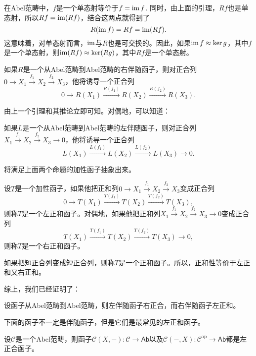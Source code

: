 在Abel范畴中，$f$是一个单态射等价于$f=\operatorname{im} f$. 同时，由上面的引理，$Rf$也是单态射，所以$Rf=\operatorname{im}(Rf)$，结合这两点就得到了
\[
	R(\operatorname{im} f)=Rf=\operatorname{im}(Rf).
\]
这意味着，对单态射而言，$\operatorname{im}$与$R$也是可交换的。因此，如果$\operatorname{im} f\approx \ker g$，其中$f$是一个单态射，则$\operatorname{im}(Rf)\approx \ker(Rg)$，其中$Rf$是一个单态射。

\begin{pro}
如果$R$是一个从Abel范畴到Abel范畴的右伴随函子，则对正合列$0\to X_1\xrightarrow{f_1} X_2\xrightarrow{f_2} X_3$，他将诱导一个正合列
\[
	0\to R(X_1)\xrightarrow{R(f_1)} R(X_2)\xrightarrow{R(f_2)} R(X_3).
\]
\end{pro}

由上一个引理和其推论立即可知。对偶地，可以知道：

\begin{pro}
如果$L$是一个从Abel范畴到Abel范畴的左伴随函子，则对正合列$X_1\xrightarrow{f_1} X_2\xrightarrow{f_2} X_3 \to 0$，他将诱导一个正合列
\[
	L(X_1)\xrightarrow{L(f_1)} L(X_2)\xrightarrow{L(f_2)} L(X_3) \to 0.
\]
\end{pro}

将满足上面两个命题的加性函子抽象出来。

\begin{para}
设$T$是一个加性函子，如果他把正和列$0\to X_1\xrightarrow{f_1} X_2\xrightarrow{f_2} X_3$变成正合列
\[
	0\to T(X_1)\xrightarrow{T(f_1)} T(X_2)\xrightarrow{T(f_2)} T(X_3),
\]
则称$T$是一个左正和函子。对偶地，如果他把正和列$X_1\xrightarrow{f_1} X_2\xrightarrow{f_2} X_3\to 0$变成正合列
\[
	T(X_1)\xrightarrow{T(f_1)} T(X_2)\xrightarrow{T(f_2)} T(X_3)\to 0,
\]
则称$T$是一个右正和函子。

如果把短正合列变成短正合列，则称$T$是一个正和函子。所以，正和性等价于左正和又右正和。
\end{para}

综上，我们已经证明了：

\begin{thm}
设函子从Abel范畴到Abel范畴，则左伴随函子右正合，而右伴随函子左正和。
\end{thm}

下面的函子不一定是伴随函子，但是它们是最常见的左正和函子。

\begin{pro}\label{homleftexact}
设$\mathcal{C}$是一个Abel范畴，则函子$\mathcal{C}(X,-):\mathcal{C}\to \mathsf{Ab}$以及$\mathcal{C}(-,X):\mathcal{C}^\mathrm{op} \to \mathsf{Ab}$都是左正合函子。
\end{pro}

